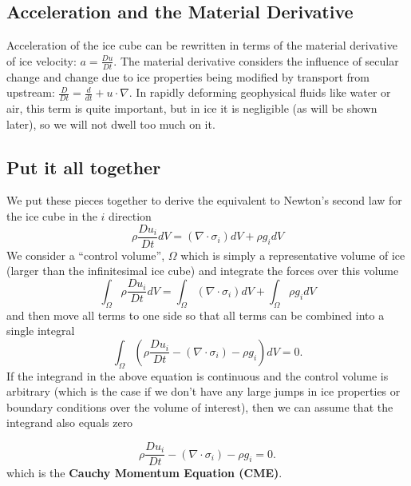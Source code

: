 \documentclass[12pt]{article}
\theoremstyle{definition}
\begin{document}
\subsection{Acceleration and the Material Derivative}

Acceleration of the ice cube can be rewritten in terms of the material derivative of ice velocity: $a = \frac{Du}{Dt}$. The material derivative considers the influence of secular change and change due to ice properties being modified by transport from upstream: $\frac{D}{Dt} = \frac{d}{dt} + u \cdot \nabla$. In rapidly deforming geophysical fluids like water or air, this term is quite important, but in ice it is negligible (as will be shown later), so we will not dwell too much on it.

\subsection{Put it all together}
We put these pieces together to derive the equivalent to Newton's second law for the ice cube in the $i$ direction
\begin{equation}
\rho \frac{Du_i}{Dt} dV = \left(\nabla \cdot \sigma_i \right) dV + \rho g_i dV
\end{equation}
We consider a ``control volume'', $\Omega$ which is simply a representative volume of ice (larger than the infinitesimal ice cube) and integrate the forces over this volume
\begin{equation}
\int_\Omega \rho \frac{Du_i}{Dt} dV = \int_\Omega \left(\nabla \cdot \sigma_i \right) dV + \int_\Omega \rho g_i dV
\end{equation}
and then move all terms to one side so that all terms can be combined into a single integral
\begin{equation}
\int_\Omega \left(\rho \frac{Du_i}{Dt} - \left(\nabla \cdot \sigma_i \right) - \rho g_i \right) dV = 0.
\end{equation}
If the integrand in the above equation is continuous and the control volume is arbitrary (which is the case if we don't have any large jumps in ice properties or boundary conditions over the volume of interest), then we can assume that the integrand also equals zero
\begin{shaded}
\begin{equation}
\rho \frac{Du_i}{Dt} - \left(\nabla \cdot \sigma_i \right) - \rho g_i = 0.
\end{equation}
which is the \textbf{Cauchy Momentum Equation (CME)}.
\end{shaded}
\end{document}
